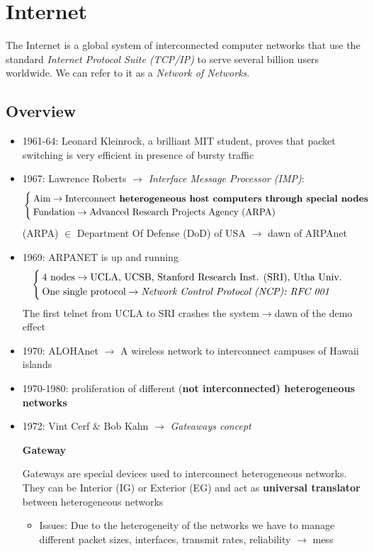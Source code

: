 \chapter{Internet}
The Internet is a global system of interconnected computer networks that use the standard \textit{Internet
Protocol Suite (TCP/IP)} to serve several billion users worldwide. We can refer to it as a \textit{Network of Networks}.
\section{Overview}
\begin{itemize}
\item 1961-64: Leonard Kleinrock, a brilliant MIT student, proves that packet switching is very efficient in presence of bursty traffic
\item 1967: Lawrence Roberts $\rightarrow$ \textit{Interface Message Processor (IMP)}: 
\begin{equation}
\begin{cases}
\text{Aim} \rightarrow \text{Interconnect \textbf{heterogeneous host computers through special nodes}}\\
\text{Fundation} \rightarrow \text{Advanced Research Projects Agency (ARPA)}
\end{cases}
\end{equation}
(ARPA) $\in$ Department Of Defense (DoD) of USA $\rightarrow$ dawn of ARPAnet
\item 1969: ARPANET is up and running
\begin{equation}
\begin{cases}
\text{4 nodes}\rightarrow \text{UCLA, UCSB, Stanford Research Inst. (SRI), Utha Univ.}\\
\text{One single protocol} \rightarrow \text{\textit{Network Control Protocol (NCP): RFC 001}} 
\end{cases}
\end{equation}
The first telnet from UCLA to SRI crashes the system$\rightarrow$dawn of the demo effect
\item 1970: ALOHAnet $\rightarrow$ A wireless network to interconnect campuses of Hawaii islands
\item 1970-1980: proliferation of different (\textbf{not interconnected) heterogeneous networks}
\item 1972: Vint Cerf $\&$ Bob Kahn $\rightarrow$ \textit{Gateaways concept}
\begin{definition}{\textbf{Gateway}}
\label{Gateway}

Gateways are special devices used to interconnect heterogeneous networks. They can be Interior (IG) or Exterior (EG) and act as \textbf{universal translator} between heterogeneous networks
\end{definition}
\begin{itemize}
\item Issues: Due to the heterogeneity of the networks we have to manage different packet sizes, interfaces, transmit rates, reliability $\rightarrow$ mess


\end{itemize}
\end{itemize}
